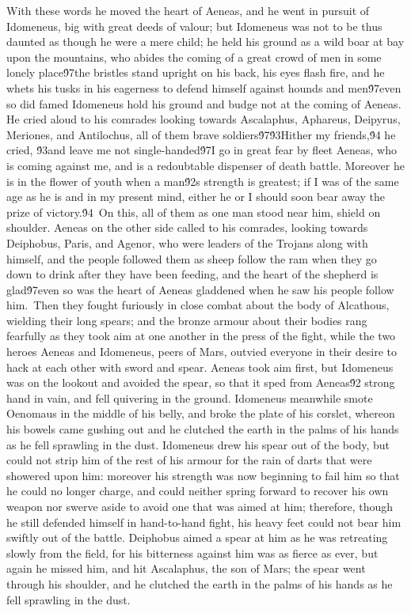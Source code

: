 {With these words he moved the heart of Aeneas, and he went in pursuit of Idomeneus, big with great deeds of valour; but Idomeneus was not to be thus daunted as though he were a mere child; he held his ground as a wild boar at bay upon the mountains, who abides the coming of a great crowd of men in some lonely place\'97the bristles stand upright on his back, his eyes flash fire, and he whets his tusks in his eagerness to defend himself against hounds and men\'97even so did famed Idomeneus hold his ground and budge not at the coming of Aeneas. He cried aloud to his comrades looking towards Ascalaphus, Aphareus, Deipyrus, Meriones, and Antilochus, all of them brave soldiers\'97\'93Hither my friends,\'94 he cried, \'93and leave me not single-handed\'97I go in great fear by fleet Aeneas, who is coming against me, and is a redoubtable dispenser of death battle. Moreover he is in the flower of youth when a man\'92s strength is greatest; if I was of the same age as he is and in my present mind, either he or I should soon bear away the prize of victory.\'94\
On this, all of them as one man stood near him, shield on shoulder. Aeneas on the other side called to his comrades, looking towards Deiphobus, Paris, and Agenor, who were leaders of the Trojans along with himself, and the people followed them as sheep follow the ram when they go down to drink after they have been feeding, and the heart of the shepherd is glad\'97even so was the heart of Aeneas gladdened when he saw his people follow him.\
Then they fought furiously in close combat about the body of Alcathous, wielding their long spears; and the bronze armour about their bodies rang fearfully as they took aim at one another in the press of the fight, while the two heroes Aeneas and Idomeneus, peers of Mars, outvied everyone in their desire to hack at each other with sword and spear. Aeneas took aim first, but Idomeneus was on the lookout and avoided the spear, so that it sped from Aeneas\'92 strong hand in vain, and fell quivering in the ground. Idomeneus meanwhile smote Oenomaus in the middle of his belly, and broke the plate of his corslet, whereon his bowels came gushing out and he clutched the earth in the palms of his hands as he fell sprawling in the dust. Idomeneus drew his spear out of the body, but could not strip him of the rest of his armour for the rain of darts that were showered upon him: moreover his strength was now beginning to fail him so that he could no longer charge, and could neither spring forward to recover his own weapon nor swerve aside to avoid one that was aimed at him; therefore, though he still defended himself in hand-to-hand fight, his heavy feet could not bear him swiftly out of the battle. Deiphobus aimed a spear at him as he was retreating slowly from the field, for his bitterness against him was as fierce as ever, but again he missed him, and hit Ascalaphus, the son of Mars; the spear went through his shoulder, and he clutched the earth in the palms of his hands as he fell sprawling in the dust.\
}
